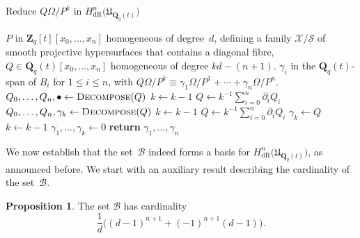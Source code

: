 \documentclass[a4paper,11pt]{article}
\numberwithin{equation}{section}
\newcommand{\ZZ}{\mathbf{Z}} %
\newcommand{\QQ}{\mathbf{Q}} %
\providecommand{\HdR}{H_{\text{dR}}}    %
\providecommand{\cB}{\mathcal{B}} %
\theoremstyle{definition}
\newtheorem{prop}[thm]{Proposition}
\begin{document}
\begin{algorithm}
\caption{Reduce $Q \Omega / P^k$ in $\HdR^n\bigl(\mathfrak{U}_{\QQ_q(t)}\bigr)$}
\label{alg:PoleRed}
\begin{algorithmic}
\vspace{1mm}
\Require $P$ in $\ZZ_q[t][x_0, \dotsc, x_n]$ homogeneous of degree~$d$, 
         defining a family $\mathcal{X}/\mathcal{S}$ of smooth projective 
         hypersurfaces that contains a diagonal fibre, $Q \in \QQ_q(t)[x_0, \dotsc, x_n]$ 
         homogeneous of degree $kd - (n+1)$.
\Ensure  $\gamma_i$ in the $\QQ_q(t)$-span of $B_i$ for $1 \leq i \leq n$, with  
         $Q \Omega / P^k \equiv \gamma_{1} \Omega / P^{1} + \dotsb + \gamma_n \Omega / P^n$.
\State $Q_0, \dotsc, Q_n, \bullet \gets \Call{Decompose}{Q}$
\State $k \gets k-1$
\State $Q \gets k^{-1} \sum_{i=0}^n \partial_i Q_i$
\EndWhile
\While{$Q \not \in \QQ_q(t)$-span of $B_k$}
\State $Q_0, \dotsc, Q_n, \gamma_k \gets \Call{Decompose}{Q}$
\State $k \gets k-1$
\State $Q \gets k^{-1} \sum_{i=0}^n \partial_i Q_i$
\EndWhile
{}
\State $\gamma_{k} \gets Q$
\State $k \gets k-1$
\EndIf
\State $\gamma_{1}, \dotsc, \gamma_{k} \gets 0$
\State \textbf{return} $\gamma_{1}, \dotsc, \gamma_n$
\EndProcedure
\end{algorithmic}
\end{algorithm}

We now establish that the set~$\cB$ indeed forms a basis for 
$\HdR^n\bigl(\mathfrak{U}_{\QQ_q(t)}\bigr)$, as announced before.  
We start with an auxiliary result describing the cardinality of 
the set~$\cB$.

\begin{prop} \label{prop:BasisSize}
The set $\cB$ has cardinality
\begin{equation*}
\frac{1}{d} \bigl((d-1)^{n+1} + (-1)^{n+1}(d-1) \bigr).
\end{equation*}
\end{prop}
\end{document}

